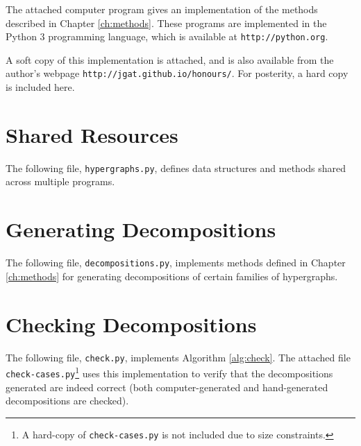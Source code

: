 The attached computer program gives an implementation of the methods described in Chapter \ref{ch:methods}.
These programs are implemented in the Python 3 programming language, which is available at \verb~http://python.org~.

A soft copy of this implementation is attached, and is also available from the author's webpage \verb~http://jgat.github.io/honours/~.
For posterity, a hard copy is included here.

\section{Shared Resources}

The following file, \verb~hypergraphs.py~, defines data structures and methods shared across multiple programs.

{\footnotesize }

\section{Generating Decompositions}

The following file, \verb~decompositions.py~, implements methods defined in Chapter \ref{ch:methods} for generating decompositions of certain families of hypergraphs.

{\footnotesize }

\section{Checking Decompositions}

The following file, \verb~check.py~, implements Algorithm \ref{alg:check}.
The attached file \verb~check-cases.py~\footnote{A hard-copy of \verb~check-cases.py~ is not included due to size constraints.} uses this implementation to verify that the decompositions generated are indeed correct (both computer-generated and hand-generated decompositions are checked).

{\footnotesize }
